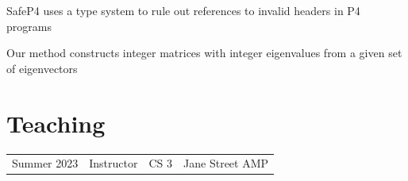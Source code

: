 \documentclass[]{deedy-resume-openfont}
\begin{document}
\begin{minipage}[t]{0.66\textwidth}


SafeP4 uses a type system to rule out references to invalid headers in P4 programs
\sectionsep







Our method constructs integer matrices with integer eigenvalues from a given set of eigenvectors
\sectionsep











\section{Teaching} 

\begin{tabular}{llll}
  
    Summer 2023 & Instructor & CS 3 & Jane Street AMP \\
  

\end{tabular}
\end{minipage}
\end{document}
